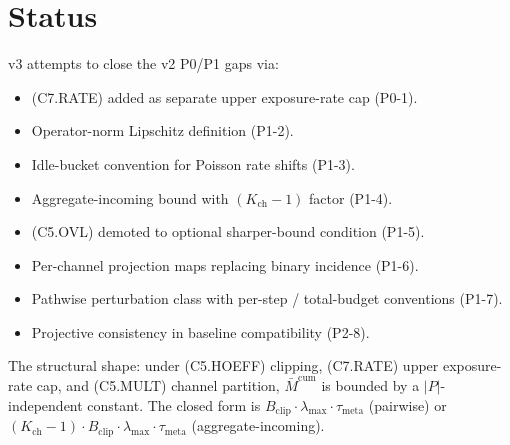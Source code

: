 \documentclass{article}
\newcommand{\Bclip}{B_{\mathrm{clip}}}
\newcommand{\Kch}{K_{\mathrm{ch}}}
\newcommand{\lammax}{\lambda_{\max}}
\newcommand{\taumeta}{\tau_{\mathrm{meta}}}
\begin{document}
\section{Status}

v3 attempts to close the v2 P0/P1 gaps via:
\begin{itemize}
\item (C7.RATE) added as separate upper exposure-rate cap (P0-1).
\item Operator-norm Lipschitz definition (P1-2).
\item Idle-bucket convention for Poisson rate shifts (P1-3).
\item Aggregate-incoming bound with $(\Kch - 1)$ factor (P1-4).
\item (C5.OVL) demoted to optional sharper-bound condition (P1-5).
\item Per-channel projection maps replacing binary incidence (P1-6).
\item Pathwise perturbation class with per-step / total-budget
  conventions (P1-7).
\item Projective consistency in baseline compatibility (P2-8).
\end{itemize}

The structural shape: under (C5.HOEFF) clipping, (C7.RATE) upper
exposure-rate cap, and (C5.MULT) channel partition,
$\bar{M}^{\mathrm{cum}}$ is bounded by a $|P|$-independent
constant.  The closed form is $\Bclip \cdot \lammax \cdot \taumeta$
(pairwise) or $(\Kch - 1) \cdot \Bclip \cdot \lammax \cdot \taumeta$
(aggregate-incoming).
\end{document}
